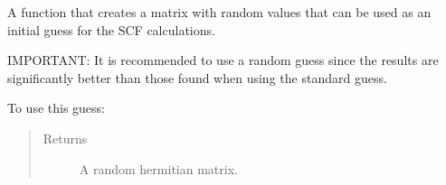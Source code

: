\documentclass[letterpaper,10pt,english]{sphinxmanual}
\begin{document}
\begin{fulllineitems}
\begin{fulllineitems}
\begin{quote}
\begin{description}
\end{description}\end{quote}

\end{fulllineitems}


\begin{fulllineitems}
\label{\detokenize{Complex_GHF:ghf.complex_GHF.ComplexGHF.random_guess}}
A function that creates a matrix with random values that can be used as an initial guess
for the SCF calculations.

IMPORTANT: It is recommended to use a random guess since the results are significantly better
than those found when using the standard guess.

To use this guess:

\begin{sphinxVerbatim}[commandchars=\\\{\}]
          
   
  
\end{sphinxVerbatim}
\begin{quote}\begin{description}
\item[{Returns}] \leavevmode
A random hermitian matrix.

\end{description}\end{quote}

\end{fulllineitems}



\end{fulllineitems}
\end{document}
